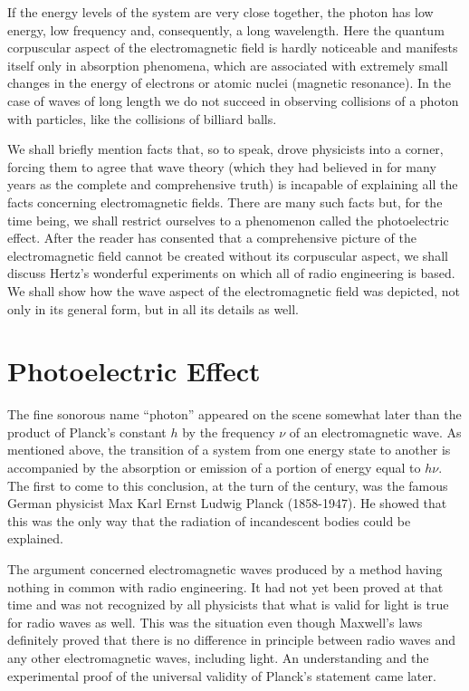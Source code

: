 If the energy levels of the system are very close together, the photon has low energy, low frequency and, consequently, a long wavelength. Here the quantum corpuscular aspect of the electromagnetic field is hardly noticeable and manifests itself only in absorption phenomena, which are associated with extremely small changes in the energy of electrons or atomic nuclei (magnetic resonance). In the case of waves of long length we do not succeed in observing collisions of a photon with particles, like the collisions of billiard balls.

We shall briefly mention facts that, so to speak, drove physicists into a corner, forcing them to agree that wave theory (which they had believed in for many years as the complete and comprehensive truth) is incapable of explaining all the facts concerning electromagnetic fields. There are many such facts but, for the time being, we shall restrict ourselves to a phenomenon called the photoelectric effect. After the reader has consented that a comprehensive picture of the electromagnetic field cannot be created without its corpuscular aspect, we shall discuss Hertz's wonderful experiments on which all of radio engineering is based. We shall show how the wave aspect of the electromagnetic field was depicted, not only in its general form, but in all its details as well.

\section{Photoelectric Effect}

The fine sonorous name ``photon'' appeared on the scene somewhat later than the product of Planck's constant $h$ by the frequency $\nu$ of an electromagnetic wave. As mentioned above, the transition of a system from one energy state to another is accompanied by the absorption or emission of a portion of energy equal to $h\nu$. The first to come to this conclusion, at the turn of the century, was the famous German physicist Max Karl Ernst Ludwig Planck (1858-1947). He showed that this was the only way that the radiation of incandescent bodies could be explained. 

The argument concerned electromagnetic waves produced by a method having nothing in common with radio engineering. It had not yet been proved at that time and was not recognized by all physicists that what is valid for light is true for radio waves as well. This was the situation even though Maxwell's laws definitely proved that there is no difference in principle between radio waves and any other electromagnetic waves, including light. An understanding and the experimental proof of the universal validity of Planck's statement came later.


